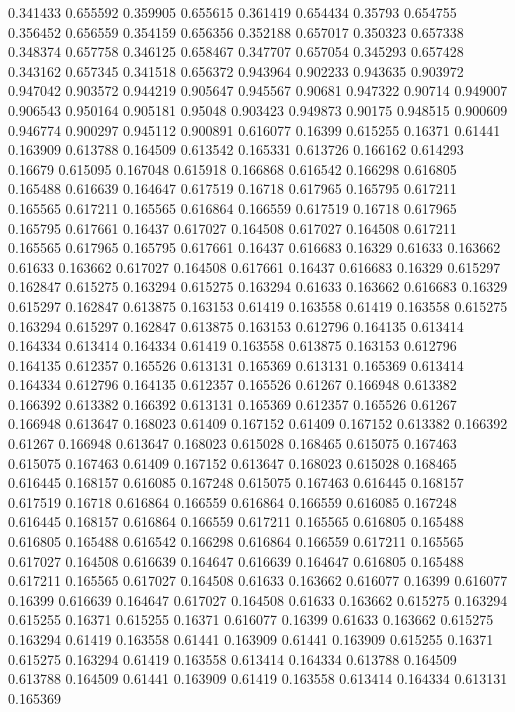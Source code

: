0.341433 0.655592
0.359905 0.655615
0.361419 0.654434
0.35793 0.654755
0.356452 0.656559
0.354159 0.656356
0.352188 0.657017
0.350323 0.657338
0.348374 0.657758
0.346125 0.658467
0.347707 0.657054
0.345293 0.657428
0.343162 0.657345
0.341518 0.656372
0.943964 0.902233
0.943635 0.903972
0.947042 0.903572
0.944219 0.905647
0.945567 0.90681
0.947322 0.90714
0.949007 0.906543
0.950164 0.905181
0.95048 0.903423
0.949873 0.90175
0.948515 0.900609
0.946774 0.900297
0.945112 0.900891
0.616077 0.16399
0.615255 0.16371
0.61441 0.163909
0.613788 0.164509
0.613542 0.165331
0.613726 0.166162
0.614293 0.16679
0.615095 0.167048
0.615918 0.166868
0.616542 0.166298
0.616805 0.165488
0.616639 0.164647
0.617519 0.16718
0.617965 0.165795
0.617211 0.165565
0.617211 0.165565
0.616864 0.166559
0.617519 0.16718
0.617965 0.165795
0.617661 0.16437
0.617027 0.164508
0.617027 0.164508
0.617211 0.165565
0.617965 0.165795
0.617661 0.16437
0.616683 0.16329
0.61633 0.163662
0.61633 0.163662
0.617027 0.164508
0.617661 0.16437
0.616683 0.16329
0.615297 0.162847
0.615275 0.163294
0.615275 0.163294
0.61633 0.163662
0.616683 0.16329
0.615297 0.162847
0.613875 0.163153
0.61419 0.163558
0.61419 0.163558
0.615275 0.163294
0.615297 0.162847
0.613875 0.163153
0.612796 0.164135
0.613414 0.164334
0.613414 0.164334
0.61419 0.163558
0.613875 0.163153
0.612796 0.164135
0.612357 0.165526
0.613131 0.165369
0.613131 0.165369
0.613414 0.164334
0.612796 0.164135
0.612357 0.165526
0.61267 0.166948
0.613382 0.166392
0.613382 0.166392
0.613131 0.165369
0.612357 0.165526
0.61267 0.166948
0.613647 0.168023
0.61409 0.167152
0.61409 0.167152
0.613382 0.166392
0.61267 0.166948
0.613647 0.168023
0.615028 0.168465
0.615075 0.167463
0.615075 0.167463
0.61409 0.167152
0.613647 0.168023
0.615028 0.168465
0.616445 0.168157
0.616085 0.167248
0.615075 0.167463
0.616445 0.168157
0.617519 0.16718
0.616864 0.166559
0.616864 0.166559
0.616085 0.167248
0.616445 0.168157
0.616864 0.166559
0.617211 0.165565
0.616805 0.165488
0.616805 0.165488
0.616542 0.166298
0.616864 0.166559
0.617211 0.165565
0.617027 0.164508
0.616639 0.164647
0.616639 0.164647
0.616805 0.165488
0.617211 0.165565
0.617027 0.164508
0.61633 0.163662
0.616077 0.16399
0.616077 0.16399
0.616639 0.164647
0.617027 0.164508
0.61633 0.163662
0.615275 0.163294
0.615255 0.16371
0.615255 0.16371
0.616077 0.16399
0.61633 0.163662
0.615275 0.163294
0.61419 0.163558
0.61441 0.163909
0.61441 0.163909
0.615255 0.16371
0.615275 0.163294
0.61419 0.163558
0.613414 0.164334
0.613788 0.164509
0.613788 0.164509
0.61441 0.163909
0.61419 0.163558
0.613414 0.164334
0.613131 0.165369
